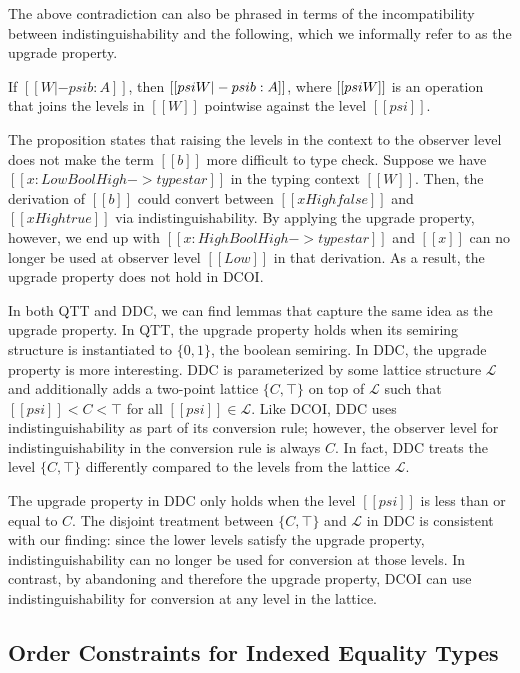 \documentclass[acmsmall]{acmart}
\newcommand{\name}{DCOI\xspace}
\begin{document}
The above contradiction can also be phrased in terms of the
incompatibility between indistinguishability and the
following, which we informally refer to as the upgrade
property.

\begin{proposition}[Upgrade property, does not hold for \name{}]
\label{prop:upgrade}
If $[[W |- psi b : A]]$, then $[[psi \/ W |- psi b : A]]$, where
$[[psi \/ W]]$ is an operation that joins the levels in $[[W]]$
pointwise against the level $[[psi]]$.
\end{proposition}

The proposition states that raising the levels in the context to the
observer level does not make the term $[[b]]$ more difficult to type
check. Suppose we have $[[x : Low Bool High -> type star]]$ in
the typing context $[[W]]$. Then, the derivation of $[[b]]$ could
convert between $[[x High false]]$ and $[[x High true]]$ via
indistinguishability. By applying the upgrade property, however,
we end up with $[[ x : High Bool High -> type star ]]$ and $[[x]]$ can no
longer be used at observer level $[[Low]]$ in that derivation.
As a result, the upgrade property does not hold
in \name{}.

In both QTT and 
DDC, we can find lemmas that capture the same idea as
the upgrade property. In QTT, the upgrade property holds when
its semiring structure is instantiated to $\{0,1\}$, the boolean semiring. In DDC, the
upgrade property is more interesting. 
DDC is parameterized by
some lattice structure $\mathcal{L}$ and additionally adds a two-point
lattice $\{C, \top\}$ on top of $\mathcal{L}$ such that $[[psi]] < C < \top$
for all $[[psi]] \in \mathcal{L}$. Like \name{}, DDC uses
indistinguishability as part of its conversion rule; however, the
observer level for indistinguishability in the conversion rule is
always $C$. In fact, DDC treats the level $\{C, \top\}$ differently
compared to the levels from the lattice $\mathcal{L}$.

The upgrade
property in DDC only holds when the level $[[psi]]$ is less than or
equal to $C$. The disjoint treatment between $\{C, \top\}$ and
$\mathcal{L}$ in DDC is consistent with our finding: since the lower
levels satisfy the upgrade property, indistinguishability can no
longer be used for conversion at those levels. In contrast,
by abandoning  and therefore the upgrade property,
\name{} can use indistinguishability for conversion at any level in the lattice.

\subsection{Order Constraints for Indexed Equality Types}
\label{sec:orderconstraints}
\end{document}
